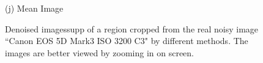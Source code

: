 \documentclass[10pt,onecolumn,letterpaper]{article}
\begin{document}
\begin{figure}[H]
{\begin{minipage}[t]{0.195\textwidth}
{\footnotesize (j) Mean Image \cite{crosschannel2016} }
\end{minipage}
}
\caption{Denoised imagessupp of a region cropped from the real noisy image ``Canon EOS 5D Mark3 ISO 3200 C3" \cite{crosschannel2016} by different methods. The images are better viewed by zooming in on screen.} 
\label{fig12}
\end{figure}

\begin{figure}[H]\vspace{1mm}
\centering
{}
\end{figure}
\end{document}
